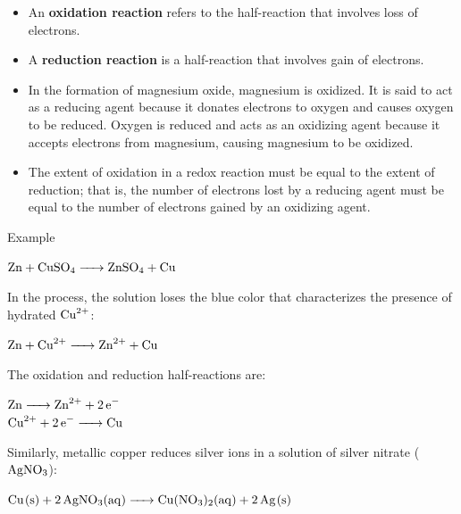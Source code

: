 \documentclass[a4paper,12pt,twocolumn]{article}
\begin{document}
\begin{itemize}
\item An \textbf{oxidation reaction} refers to the half-reaction that involves loss of electrons.
\item A \textbf{reduction reaction} is a half-reaction that involves gain of electrons.
\item In the formation of magnesium oxide, magnesium is oxidized. It is said to act as a reducing agent because it donates electrons to oxygen and causes oxygen to be reduced. Oxygen is reduced and acts as an oxidizing agent because it accepts electrons from magnesium, causing magnesium to be oxidized. 
\item The extent of oxidation in a redox reaction must be equal to the extent of reduction; that is, the number of electrons lost by a reducing agent must be equal to the number of electrons gained by an oxidizing agent.

\end{itemize}

\begin{Box2}{Example}\begin{center}
$\ce{Zn + CuSO4 -> ZnSO4 + Cu}$
\end{center}
In the process, the solution loses the blue color that characterizes the presence of hydrated $\ce{Cu^{2+}}$:
\begin{center}
$\ce{Zn + Cu^{2+} -> Zn^{2+} + Cu}$
\end{center}
The oxidation and reduction half-reactions are:
\begin{center}
$\ce{Zn -> Zn^{2+} + 2e^-}$\\
$\ce{Cu^{2+} + 2e^- -> Cu}$
\end{center}
Similarly, metallic copper reduces silver ions in a solution of silver nitrate ($\ce{AgNO3}$):
\begin{center}
$\ce{Cu(s) + 2AgNO3(aq) -> Cu(NO3)2(aq) + 2Ag(s)}$
\end{center}
\end{Box2}
\end{document}
